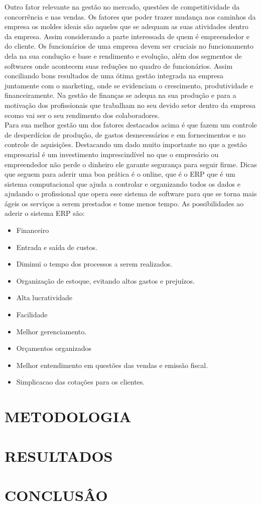 \documentclass[a4paper,12pt]{article}
\begin{document}
   Outro fator relevante na gestão no mercado, questões de competitividade da concorrência e nas vendas.
   Os fatores que poder trazer mudança nos caminhos da empresa os moldes ideais são aqueles que se adequam as suas atividades dentro da empresa.
   Assim considerando a parte interessada de quem é empreendedor e do cliente.
   Os funcionários de uma empresa devem ser cruciais no funcionamento dela na sua condução e base e rendimento e evolução, além dos segmentos de softwares onde acontecem suas reduções no quadro de funcionários.
   Assim conciliando bons resultados de uma ótima gestão integrada na empresa juntamente com o marketing,  onde se evidenciam o crescimento, produtividade e financeiramente.
   Na gestão de finanças se adequa na sua produção e para a motivação dos profissionais que trabalham no seu devido setor dentro da empresa ecomo vai ser o seu rendimento dos colaboradores.\\
   Para sua melhor gestão um dos fatores destacados acima é que fazem um controle de desperdícios de produção,  de gastos desnecessários e  em fornecimentos e  no controle de aquisições.
   Destacando um dado muito importante no que a gestão empresarial é um investimento imprescindível no que o empresário ou empreendedor não perde o dinheiro ele garante segurança para seguir firme.
   Dicas que seguem para aderir uma boa prática é o online, que é o ERP que é um sistema computacional que ajuda a controlar e organizando todos os dados e ajudando o profissional que opera esse sistema de software para que se torna mais ágeis os serviços a serem prestados e tome menos tempo.
   As possibilidades ao aderir o sistema ERP são:

    \begin{itemize}
      \item Financeiro
      \item Entrada e saída de custos.
      \item Diminui o tempo dos processos a serem realizados.
      \item Organização de estoque, evitando altos gastos e prejuízos.
      \item Alta lucratividade
      \item Facilidade
      \item Melhor  gerenciamento.
      \item Orçamentos organizados
      \item Melhor entendimento em questões das vendas e emissão fiscal.
      \item Simplicacao das cotações para os clientes.
   \end{itemize}

   \pagebreak

   \section{METODOLOGIA}
   \pagebreak

   \section{RESULTADOS}
   \pagebreak
   \section{CONCLUSÂO}
   \pagebreak
\end{document}
